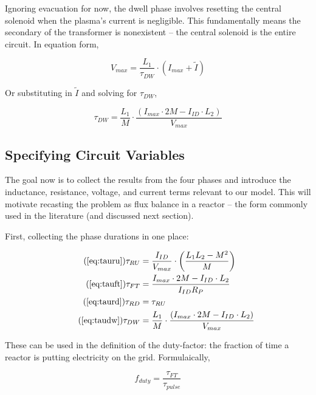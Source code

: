 Ignoring evacuation for now, the dwell phase involves resetting the central solenoid when the plasma's current is negligible. This fundamentally means the secondary of the transformer is nonexistent -- the central solenoid is the entire circuit. In equation form,

\begin{equation}
	V_{max} = \frac{L_1}{\tau_{DW}} \cdot \left( I_{max} + \tilde I \right) 
\end{equation}

Or substituting in $\tilde I$ and solving for $\tau_{DW}$,

\begin{equation}
	\label{eq:taudw}
	\tau_{DW} = \frac{L_1}{M} \cdot \frac{ \left( I_{max} \cdot 2 M - I_{ID} \cdot  L_2 \right) }{V_{max}}
\end{equation}

\subsection{Specifying Circuit Variables}

The goal now is to collect the results from the four phases and introduce the inductance, resistance, voltage, and current terms relevant to our model. This will motivate recasting the problem as flux balance in a reactor -- the form commonly used in the literature (and discussed next section).

First, collecting the phase durations in one place:

\begin{align}
	\tag{\ref{eq:tauru}}
	\tau_{RU} &= \frac{I_{ID}}{V_{max}} \cdot \left( \frac{ L_1 L_2 - M^2 }{ M } \right) \\
	\tag{\ref{eq:tauft}}
	\tau_{FT} &= \frac{ I_{max} \cdot 2 M - I_{ID} \cdot  L_2 }{I_{ID} R_P} \\
	\tag{\ref{eq:taurd}}
	\tau_{RD} &= \tau_{RU} \\
	\tag{\ref{eq:taudw}}
	\tau_{DW} &= \frac{L_1}{M} \cdot \frac{ \left( I_{max} \cdot 2 M - I_{ID} \cdot  L_2 \right) }{V_{max}}
\end{align}

These can be used in the definition of the duty-factor: the fraction of time a reactor is putting electricity on the grid. Formulaically,

\begin{equation}
	\label{eq:duty}
	f_{duty} = \frac{\tau_{FT}}{\tau_{pulse}}
\end{equation}


